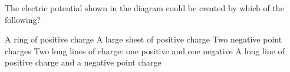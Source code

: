 \begin{questions}\setcounter{question}{24}\question
The electric potential shown in the diagram could be created by which of the following?

\begin{choices}
\choice A ring of positive charge
\choice A large sheet of positive charge
\choice Two negative point charges
\choice Two long lines of charge: one positive and one negative
\choice A long line of positive charge and a negative point charge
\end{choices}\end{questions}

